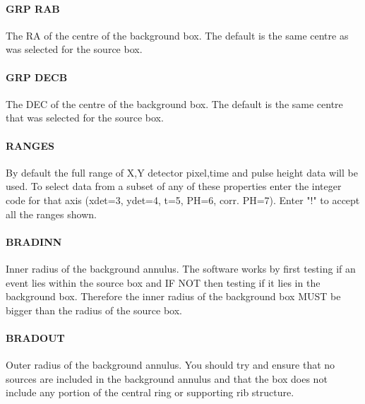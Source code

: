 \documentclass{book}
\renewcommand{\_}{{\tt\char'137}}     %
\begin{document}
\paragraph{GRP RAB}
The RA of the centre of the background box. The default is the same
centre as was selected for the source box.

\paragraph{GRP DECB}
The DEC of the centre of the background box. The default is the same
centre that was selected for the source box.

\paragraph{RANGES}
By default the full range of X,Y detector pixel,time and pulse height
data will be used.
To select data from a subset of any of these properties enter the integer
code for that axis (xdet=3, ydet=4, t=5, PH=6, corr. PH=7). Enter "!" to
accept all the ranges shown.

\paragraph{BRADINN}
Inner radius of the background annulus. The software works by first
testing if an event lies within the source box and IF NOT then testing
if it lies in the background box. Therefore the inner radius of the
background box MUST be bigger than the radius of the source box.

\paragraph{BRADOUT}
Outer radius of the background annulus. You should try and ensure that
no sources are included in the background annulus and that the box
does not include any portion of the central ring or supporting rib
structure.
\end{document}
